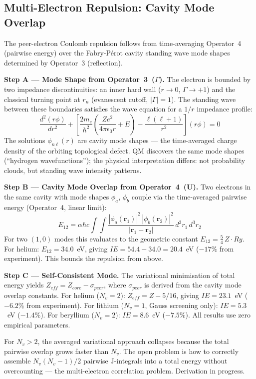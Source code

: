\subsection{Multi-Electron Repulsion: Cavity Mode Overlap}

The peer-electron Coulomb repulsion follows from time-averaging Operator~4 (pairwise energy) over the Fabry-P\'{e}rot cavity standing wave mode shapes determined by Operator~3 (reflection).

\textbf{Step A --- Mode Shape from Operator~3~($\Gamma$).}
The electron is bounded by two impedance discontinuities: an inner hard wall ($r \to 0$, $\Gamma \to +1$) and the classical turning point at $r_n$ (evanescent cutoff, $|\Gamma| = 1$). The standing wave between these boundaries satisfies the wave equation for a $1/r$ impedance profile:
\begin{equation}
    \frac{d^2(r\phi)}{dr^2} + \left[\frac{2m_e}{\hbar^2}\!\left(\frac{Ze^2}{4\pi\epsilon_0 r} + E\right) - \frac{\ell(\ell+1)}{r^2}\right](r\phi) = 0
\end{equation}
The solutions $\phi_{n\ell}(r)$ are cavity mode shapes --- the time-averaged charge density of the orbiting topological defect. QM discovers the same mode shapes (``hydrogen wavefunctions''); the physical interpretation differs: not probability clouds, but standing wave intensity patterns.

\textbf{Step B --- Cavity Mode Overlap from Operator~4~(U).}
Two electrons in the same cavity with mode shapes $\phi_a$, $\phi_b$ couple via the time-averaged pairwise energy (Operator~4, linear limit):
\begin{equation}
    E_{12} = \alpha\hbar c \int\!\!\!\int \frac{|\phi_a(\mathbf{r}_1)|^2\,|\phi_b(\mathbf{r}_2)|^2}{|\mathbf{r}_1 - \mathbf{r}_2|}\, d^3r_1\, d^3r_2
\end{equation}
For two $(1,0)$ modes this evaluates to the geometric constant $E_{12} = \tfrac{5}{4}\,Z \cdot Ry$. For helium: $E_{12} = 34.0$~eV, giving $IE = 54.4 - 34.0 = 20.4$~eV ($-17\%$ from experiment). This bounds the repulsion from above.

\textbf{Step C --- Self-Consistent Mode.}
The variational minimisation of total energy yields $Z_{eff} = Z_{core} - \sigma_{peer}$, where $\sigma_{peer}$ is derived from the cavity mode overlap constants. For helium ($N_v = 2$): $Z_{eff} = Z - 5/16$, giving $IE = 23.1$~eV ($-6.2\%$ from experiment). For lithium ($N_v = 1$, Gauss screening only): $IE = 5.3$~eV ($-1.4\%$). For beryllium ($N_v = 2$): $IE = 8.6$~eV ($-7.5\%$). All results use zero empirical parameters.

For $N_v > 2$, the averaged variational approach collapses because the total pairwise overlap grows faster than $N_v$. The open problem is how to correctly assemble $N_v(N_v-1)/2$ pairwise J-integrals into a total energy without overcounting --- the multi-electron correlation problem. Derivation in progress.

